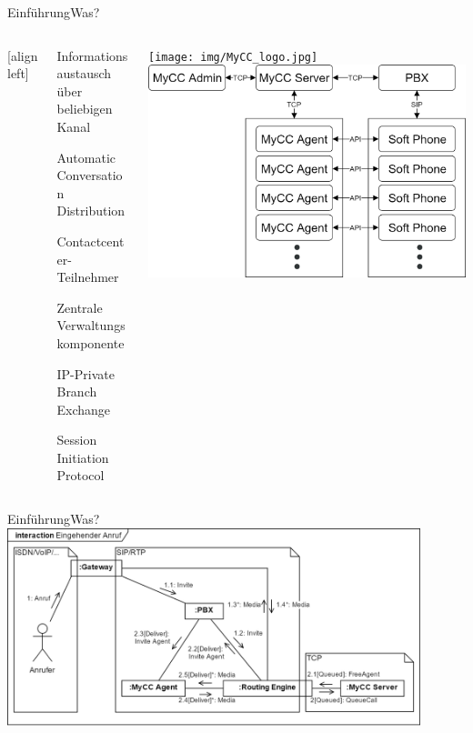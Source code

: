 \documentclass[t,aspectratio=169,divpsnames]{beamer}
\begin{document}
\begin{frame}{Einführung}{Was?}
	\begin{columns}[T]
		[align left]
		\begin{column}{0.55\textwidth}
			\only<2->
			{
				\begin{description}
					\item<2->[Konversation] Informationsaustausch über beliebigen Kanal
					\item<3->[ACD] Automatic Conversation Distribution	
					\item<4->[Agent] Contactcenter-Teilnehmer
					\item<5->[MyCC-Server] Zentrale Verwaltungskomponente		
					\item<6->[IP-PBX] IP-Private Branch Exchange
					\item<7->[SIP] Session Initiation Protocol
				\end{description}
			}
		\end{column}
		\begin{column}{0.45\textwidth}
				\only<1-7>
				{
					\vspace{0.5cm}
        			\texttt{[image: img/MyCC\_logo.jpg]}
				}        		
        		\only<8>
				{
					\vspace{0.5cm}
					\includegraphics[scale=0.15]{img/MyCCStructure.png}
				}
    	\end{column}
    \end{columns}
\end{frame}

\begin{frame}{Einführung}{Was?}
	\center
	\includegraphics[width=0.9\textwidth]{img/RoutingEngineSipExplanation.png}
\end{frame}
\end{document}
